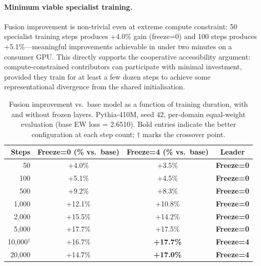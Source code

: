 \documentclass{article}
\begin{document}
\paragraph{Minimum viable specialist training.} Fusion improvement is non-trivial even at extreme compute constraint: 50 specialist training steps produces +4.0\% gain (freeze=0) and 100 steps produces +5.1\%---meaningful improvements achievable in under two minutes on a consumer GPU. This directly supports the cooperative accessibility argument: compute-constrained contributors can participate with minimal investment, provided they train for at least a few dozen steps to achieve some representational divergence from the shared initialisation.

\begin{table}[h]
\centering
\caption{Fusion improvement vs.\ base model as a function of training duration, with and without frozen layers. Pythia-410M, seed 42, per-domain equal-weight evaluation (base EW loss = 2.6510). Bold entries indicate the better configuration at each step count; $\dagger$ marks the crossover point.}
\label{tab:crossover}
\begin{tabular}{rccc}
\toprule
\textbf{Steps} & \textbf{Freeze=0} (\% vs.\ base) & \textbf{Freeze=4} (\% vs.\ base) & \textbf{Leader} \\
\midrule
50    & +4.0\%   & +3.5\%   & \textbf{Freeze=0} \\
100   & +5.1\%   & +4.5\%   & \textbf{Freeze=0} \\
500   & +9.2\%   & +8.3\%   & \textbf{Freeze=0} \\
1,000 & +12.1\%  & +10.8\%  & \textbf{Freeze=0} \\
2,000 & +15.5\%  & +14.2\%  & \textbf{Freeze=0} \\
5,000 & +17.7\%  & +17.5\%  & \textbf{Freeze=0} \\
10,000$^\dagger$ & +16.7\% & \textbf{+17.7\%} & \textbf{Freeze=4} \\
20,000 & +14.7\% & \textbf{+17.0\%} & \textbf{Freeze=4} \\
\bottomrule
\end{tabular}
\end{table}
\end{document}
